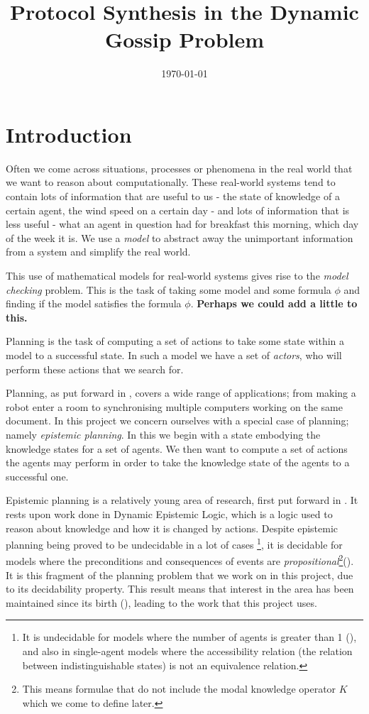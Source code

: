\documentclass[10pt, a4paper]{report}
\title{Protocol Synthesis in the Dynamic Gossip Problem} %
\author{
	\authorstyle{Leo Poulson}
	\newline\newline %
}
\date{\today}
\begin{document}
\maketitle
\thispagestyle{firstpage}

\tableofcontents
\newpage

\chapter{Introduction}
\label{sec:Introduction}

Often we come across situations, processes or phenomena in the real world that
we want to reason about computationally. These real-world systems tend to
contain lots of information that are useful to us - the state of knowledge of a
certain agent, the wind speed on a certain day - and lots of information that is
less useful - what an agent in question had for breakfast this morning, which
day of the week it is. We use a \emph{model} to abstract away the unimportant
information from a system and simplify the real world. 

This use of mathematical models for real-world systems gives rise to the
\emph{model checking} problem. This is the task of taking some model  and
some formula $\phi$ and finding if the model  satisfies the formula
$\phi$. \textbf{Perhaps we could add a little to this. }

Planning is the task of computing a set of actions to take some state within a
model to a successful state. In such a model we have a set of \emph{actors},
who will perform these actions that we search for.

Planning, as put forward in \cite{PlanningBook}, covers a wide range of
applications; from making a robot enter a room to synchronising multiple
computers working on the same document. In this project we concern ourselves
with a special case of planning; namely \emph{epistemic planning}. In this we
begin with a state embodying the knowledge states for a set of agents. We then
want to compute a set of actions the agents may perform in order to take the
knowledge state of the agents to a successful one.

Epistemic planning is a relatively young area of research, first put forward in
\cite{BolanderEP}. It rests upon work done in Dynamic Epistemic Logic, which is
a logic used to reason about knowledge and how it is changed by actions. Despite
epistemic planning being proved to be undecidable in a lot of cases \footnote{It
  is undecidable for models where the number of agents is greater than 1
  (\cite{UndecidabilityEP}), and also in single-agent models where the
  accessibility relation (the relation between indistinguishable states) is not
  an equivalence relation.}, it is decidable for models where the preconditions
and consequences of events are \emph{propositional}\footnote{This means formulae
  that do not include the modal knowledge operator $K$ which we come to define
  later.}(\cite{DecidabilityEp}). It is this fragment of the planning problem
that we work on in this project, due to its decidability property. This result
means that interest in the area has been maintained since its birth
(\cite{AutomataTechniques}), leading to the work that this project uses.
\end{document}
